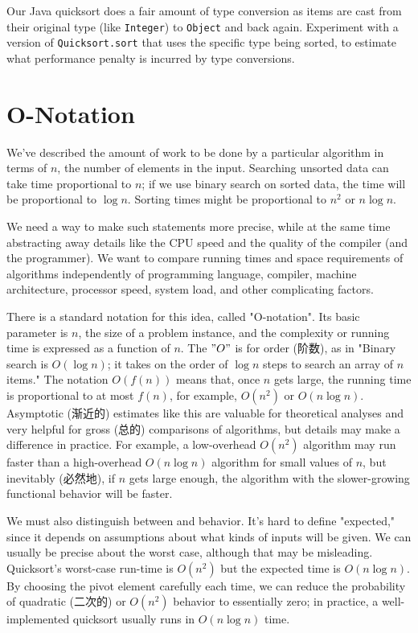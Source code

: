 \begin{exercise}
Our Java quicksort does a fair amount of type conversion as items are cast
from their original type (like \verb'Integer') to \verb'Object' and back
again.  Experiment with a version of \verb'Quicksort.sort' that uses the
specific type being sorted, to estimate what performance penalty is
incurred by type conversions.
\end{exercise}

\section{O-Notation}
\label{sec:o_notation}

We've described the amount of work to be done by a particular algorithm in
terms of $n$, the number of elements in the input. Searching unsorted data
can take time proportional to $n$; if we use binary search on sorted data,
the time will be proportional to $\log n$. Sorting times might be
proportional to $n^2$ or $n\log n$.

We need a way to make such statements more precise, while at the same time
abstracting away details like the CPU speed and the quality of the compiler
(and the programmer). We want to compare running times and space
requirements of algorithms independently of programming language, compiler,
machine architecture, processor speed, system load, and other complicating
factors.

There is a standard notation for this idea, called "O-notation". Its basic
parameter is $n$, the size of a problem instance, and the complexity or
running time is expressed as a function of $n$. The $"O"$ is for order
(阶数), as in "Binary search is $O(\log n)$; it takes on the order of $\log
n$ steps to search an array of $n$ items." The notation $O(f(n))$ means
that, once $n$ gets large, the running time is proportional to at most
$f(n)$, for example, $O(n^2)$ or $O(n\log n)$. Asymptotic (渐近的)
estimates like this are valuable for theoretical analyses and very helpful
for gross (总的) comparisons of algorithms, but details may make a
difference in practice. For example, a low-overhead $O(n^2)$ algorithm may
run faster than a high-overhead $O(n\log n)$ algorithm for small values of
$n$, but inevitably (必然地), if $n$ gets large enough, the algorithm with
the slower-growing functional behavior will be faster.

We must also distinguish between  and 
behavior. It's hard to define "expected," since it depends on assumptions
about what kinds of inputs will be given. We can usually be precise about
the worst case, although that may be misleading.  Quicksort's worst-case
run-time is $O(n^2)$ but the expected time is $O(n\log n)$. By choosing the
pivot element carefully each time, we can reduce the probability of
quadratic (二次的) or $O(n^2)$ behavior to essentially zero; in practice, a
well-implemented quicksort usually runs in $O(n\log n)$ time.

